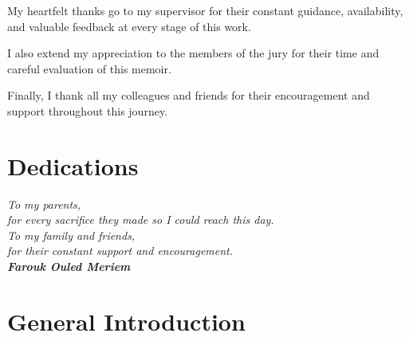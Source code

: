 \documentclass[12pt,a4paper]{report}
\begin{document}
\vspace{0.5cm}
My heartfelt thanks go to my supervisor for their constant guidance,
availability, and valuable feedback at every stage of this work.

\vspace{0.5cm}
I also extend my appreciation to the members of the jury for their time
and careful evaluation of this memoir.

\vspace{0.5cm}
Finally, I thank all my colleagues and friends for their encouragement
and support throughout this journey.


\newpage
\chapter*{Dedications}

\vspace{2.5cm}

\begin{center}
  \itshape\large
  To my parents,\\[8pt]
  for every sacrifice they made so I could reach this day.\\[24pt]

  To my family and friends,\\[8pt]
  for their constant support and encouragement.\\[24pt]

  \upshape\normalsize\textbf{Farouk Ouled Meriem}
\end{center}


\newpage
\tableofcontents
\newpage
\listoffigures
\newpage
\listoftables


\newpage
{}  %

\chapter*{General Introduction}
\end{document}
